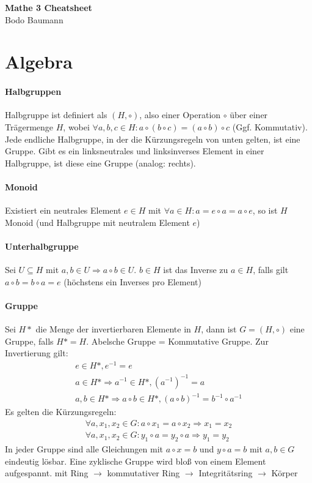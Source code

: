 \documentclass[12pt,landscape]{article}
\begin{document}
\footnotesize
\begin{multicols}{3}

\begin{center}
     \Large{\textbf{Mathe 3 Cheatsheet}} \\
     \small{Bodo Baumann}
\end{center}

\section{Algebra}
\paragraph{Halbgruppen} Halbgruppe ist definiert als $(H, \circ)$, also einer Operation $\circ$ über einer Trägermenge $H$, wobei $\forall a, b, c \in H : a \circ (b \circ c) = (a \circ b) \circ c$ (Ggf. Kommutativ). Jede endliche Halbgruppe, in der die Kürzungsregeln von unten gelten, ist eine Gruppe. Gibt es ein linksneutrales und linksinverses Element in einer Halbgruppe, ist diese eine Gruppe (analog: rechts).
\paragraph{Monoid} Existiert ein neutrales Element $e \in H$ mit $\forall a \in H : a = e \circ a = a \circ e$, so ist $H$ Monoid (und Halbgruppe mit neutralem Element $e$)
\paragraph{Unterhalbgruppe} Sei $U \subseteq H$ mit $a, b \in U \Rightarrow a \circ b \in U$. $b \in H$ ist das Inverse zu $a \in H$, falls gilt $a \circ b = b \circ a = e$ (höchstens ein Inverses pro Element)
\paragraph{Gruppe} Sei $H*$ die Menge der invertierbaren Elemente in $H$, dann ist $G = (H, \circ)$ eine Gruppe, falls $H* = H$. Abelsche Gruppe = Kommutative Gruppe. Zur Invertierung gilt:
\begin{eqnarray}
 e \in H*, e^{-1} = e \\
 a \in H* \Rightarrow a^{-1} \in H*, (a^{-1})^{-1} = a \\
 a, b \in H* \Rightarrow a \circ b \in H*, (a \circ b)^{-1} = b^{-1} \circ a^{-1}
\end{eqnarray}
Es gelten die Kürzungsregeln:
\begin{eqnarray}
\forall a, x_1, x_2 \in G : a \circ x_1 = a \circ x_2 \Rightarrow x_1 = x_2 \\
\forall a, x_1, x_2 \in G : y_1 \circ a = y_2 \circ a \Rightarrow y_1 = y_2
\end{eqnarray}
In jeder Gruppe sind alle Gleichungen mit $a \circ x = b$ und $y \circ a = b$ mit $a, b \in G$ eindeutig lösbar. Eine zyklische Gruppe wird bloß von einem Element aufgespannt.
 mit Ring $\rightarrow$ kommutativer Ring $\rightarrow$ Integritätsring $\rightarrow$ Körper

\end{multicols}
\end{document}
